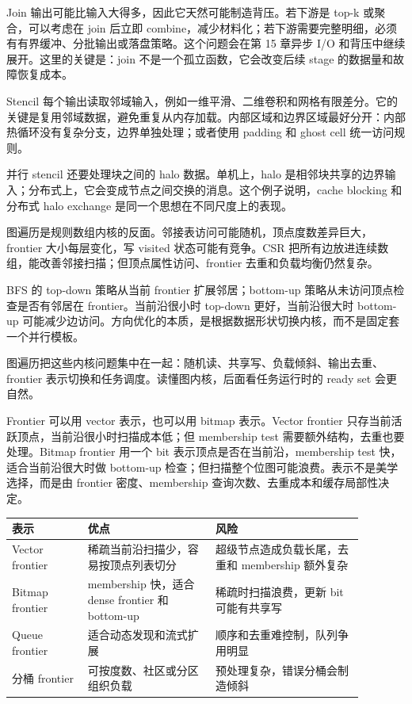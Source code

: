 Join 输出可能比输入大得多，因此它天然可能制造背压。若下游是 top-k 或聚合，可以考虑在 join 后立即 combine，减少材料化；若下游需要完整明细，必须有有界缓冲、分批输出或落盘策略。这个问题会在第 15 章异步 I/O 和背压中继续展开。这里的关键是：join 不是一个孤立函数，它会改变后续 stage 的数据量和故障恢复成本。

Stencil 每个输出读取邻域输入，例如一维平滑、二维卷积和网格有限差分。它的关键是复用邻域数据，避免重复从内存加载。内部区域和边界区域最好分开：内部热循环没有复杂分支，边界单独处理；或者使用 padding 和 ghost cell 统一访问规则。

并行 stencil 还要处理块之间的 halo 数据。单机上，halo 是相邻块共享的边界输入；分布式上，它会变成节点之间交换的消息。这个例子说明，cache blocking 和分布式 halo exchange 是同一个思想在不同尺度上的表现。

图遍历是规则数组内核的反面。邻接表访问可能随机，顶点度数差异巨大，frontier 大小每层变化，写 visited 状态可能有竞争。CSR 把所有边放进连续数组，能改善邻接扫描；但顶点属性访问、frontier 去重和负载均衡仍然复杂。

BFS 的 top-down 策略从当前 frontier 扩展邻居；bottom-up 策略从未访问顶点检查是否有邻居在 frontier。当前沿很小时 top-down 更好，当前沿很大时 bottom-up 可能减少边访问。方向优化的本质，是根据数据形状切换内核，而不是固定套一个并行模板。

\begin{mentalmodel}
图遍历把这些内核问题集中在一起：随机读、共享写、负载倾斜、输出去重、frontier 表示切换和任务调度。读懂图内核，后面看任务运行时的 ready set 会更自然。
\end{mentalmodel}

Frontier 可以用 vector 表示，也可以用 bitmap 表示。Vector frontier 只存当前活跃顶点，当前沿很小时扫描成本低；但 membership test 需要额外结构，去重也要处理。Bitmap frontier 用一个 bit 表示顶点是否在当前沿，membership test 快，适合当前沿很大时做 bottom-up 检查；但扫描整个位图可能浪费。表示不是美学选择，而是由 frontier 密度、membership 查询次数、去重成本和缓存局部性决定。

\begin{center}
\begin{tabular}{p{0.19\linewidth}p{0.32\linewidth}p{0.37\linewidth}}
\toprule
表示 & 优点 & 风险 \\
\midrule
Vector frontier & 稀疏当前沿扫描少，容易按顶点列表切分 & 超级节点造成负载长尾，去重和 membership 额外复杂 \\
Bitmap frontier & membership 快，适合 dense frontier 和 bottom-up & 稀疏时扫描浪费，更新 bit 可能有共享写 \\
Queue frontier & 适合动态发现和流式扩展 & 顺序和去重难控制，队列争用明显 \\
分桶 frontier & 可按度数、社区或分区组织负载 & 预处理复杂，错误分桶会制造倾斜 \\
\bottomrule
\end{tabular}
\end{center}

